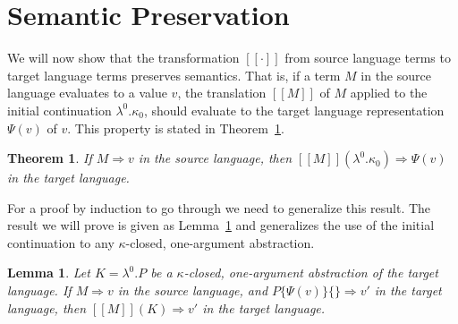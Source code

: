 \documentclass[a4paper,11pt,draft]{article}
\newtheorem{lemma}{\sffamily Lemma}
\newtheorem{theorem}{\sffamily Theorem}
\begin{document}
\section{Semantic Preservation}\label{sec:semanticpreservation}

We will now show that the transformation $[\![\cdot]\!]$ from source language
terms to target language terms preserves semantics. That is, if a term $M$ in
the source language evaluates to a value $v$, the translation $[\![M]\!]$ of $M$
applied to the initial continuation $\lambda^{0}.\kappa_{0}$, should evaluate to
the target language representation $\Psi(v)$ of $v$. This property is stated in
Theorem~\ref{thm:maintheorem}.

\begin{theorem}\label{thm:maintheorem}
If $M \Rightarrow v$ in the source language, then
$[\![M]\!] (\lambda^{0}.\kappa_{0}) \Rightarrow \Psi(v)$ in the target language.
\end{theorem}

For a proof by induction to go through we need to generalize this result. The
result we will prove is given as Lemma~\ref{lem:mainlemma} and generalizes the
use of the initial continuation to any $\kappa$-closed, one-argument
abstraction.

\begin{lemma}\label{lem:mainlemma}
  Let $K = \lambda^{0}.P$ be a $\kappa$-closed, one-argument
  abstraction of the target language. If $M \Rightarrow v$ in the
  source language, and $P\{\Psi(v)\}\{\} \Rightarrow v'$ in the target
  language, then $[\![M]\!](K) \Rightarrow v'$ in the target language.
\end{lemma}
\end{document}
